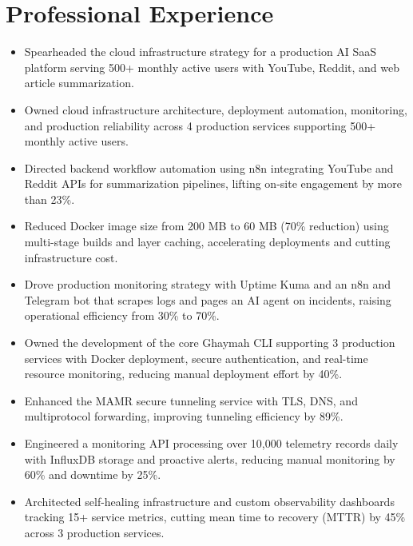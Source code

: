 \documentclass{resume}
\begin{document}
\section{Professional Experience}

\begin{itemize}
  \item Spearheaded the cloud infrastructure strategy for a production AI SaaS platform serving 500+ monthly active users with YouTube, Reddit, and web article summarization.
  \item Owned cloud infrastructure architecture, deployment automation, monitoring, and production reliability across 4 production services supporting 500+ monthly active users.
  \item Directed backend workflow automation using n8n integrating YouTube and Reddit APIs for summarization pipelines, lifting on-site engagement by more than 23\%.
  \item Reduced Docker image size from 200 MB to 60 MB (70\% reduction) using multi-stage builds and layer caching, accelerating deployments and cutting infrastructure cost.
  \item Drove production monitoring strategy with Uptime Kuma and an n8n and Telegram bot that scrapes logs and pages an AI agent on incidents, raising operational efficiency from 30\% to 70\%.
\end{itemize}

\begin{itemize}
  \item Owned the development of the core Ghaymah CLI supporting 3 production services with Docker deployment, secure authentication, and real-time resource monitoring, reducing manual deployment effort by 40\%.
  \item Enhanced the MAMR secure tunneling service with TLS, DNS, and multiprotocol forwarding, improving tunneling efficiency by 89\%.
  \item Engineered a monitoring API processing over 10,000 telemetry records daily with InfluxDB storage and proactive alerts, reducing manual monitoring by 60\% and downtime by 25\%.
  \item Architected self-healing infrastructure and custom observability dashboards tracking 15+ service metrics, cutting mean time to recovery (MTTR) by 45\% across 3 production services.
\end{itemize}
\end{document}
